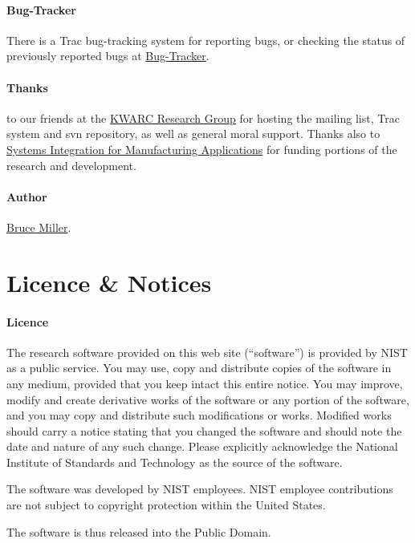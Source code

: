 \documentclass{article}
\begin{document}
\paragraph{Bug-Tracker}
  There is a Trac bug-tracking system for reporting bugs, or checking the
  status of previously reported bugs at
 \href{https://trac.mathweb.org/LaTeXML/}{Bug-Tracker}.


\paragraph{Thanks} to our friends at
the \href{http://kwarc.info}{KWARC Research Group}
for hosting the mailing list, Trac system and svn repository,
as well as general moral support.
Thanks also to \href{http://www.nist.gov/el/msid/sima/}{Systems Integration for Manufacturing Applications}
for funding portions of the research and development.

\paragraph{Author} \href{mailto:bruce.miller@nist.gov}{Bruce Miller}.
\section{Licence \& Notices}\label{notices}

\paragraph{Licence}
The research software provided on this web site (``software'') is
provided by NIST as a public service. You may use, copy and distribute
copies of the software in any medium, provided that you keep intact
this entire notice. You may improve, modify and create derivative
works of the software or any portion of the software, and you may copy
and distribute such modifications or works. Modified works should
carry a notice stating that you changed the software and should note
the date and nature of any such change. Please explicitly acknowledge
the National Institute of Standards and Technology as the source of
the software.

The software was developed by NIST employees. NIST employee
contributions are not subject to copyright protection within the
United States.

The software is thus released into the Public Domain.
\end{document}
